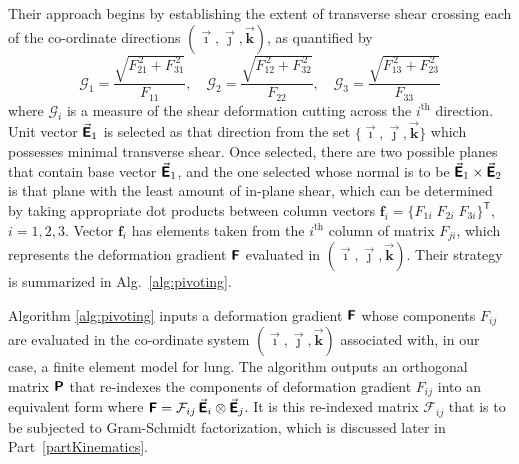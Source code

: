 Their approach begins by establishing the extent of transverse shear crossing each of the co-ordinate directions $( \vec{\boldsymbol{\imath}} , \vec{\boldsymbol{\jmath}} , \vec{\boldsymbol{k}} )$, as quantified by
\begin{equation}
\mathcal{G}_1 =\dfrac{\sqrt{F^{\,2}_{21}+F^{\,2}_{31}}}{F_{11}} , \quad
\mathcal{G}_2 =\dfrac{\sqrt{F^{\,2}_{12}+F^{\,2}_{32}}}{F_{22}} , \quad
\mathcal{G}_3 =\dfrac{\sqrt{F^{\,2}_{13}+F^{\,2}_{23}}}{F_{33}}
\end{equation} 
where $\mathcal{G}_i$ is a measure of the shear deformation cutting across the $i^{\text{th}}$ direction.  Unit vector $\vec{\boldsymbol{\mathsf{E}}}_1$ is selected as that direction from the set $\{ \vec{\boldsymbol{\imath}} , \vec{\boldsymbol{\jmath}} , \vec{\boldsymbol{k}} \}$ which possesses minimal transverse shear.  Once selected, there are two possible planes that contain base vector $\vec{\boldsymbol{\mathsf{E}}}_1$, and the one selected whose normal is to be $\vec{\boldsymbol{\mathsf{E}}}_1 \times \vec{\boldsymbol{\mathsf{E}}}_2$ is that plane with the least amount of in-plane shear, which can be determined by taking appropriate dot products between column vectors $\boldsymbol{f}_i = \{ F_{1i} \; F_{2i} \; F_{3i} \}^{\mathsf{T}}$, $i=1,2,3$.  Vector $\boldsymbol{f}_i$ has elements taken from the $i^{\text{th}}$ column of matrix $F_{ji}$, which represents the deformation gradient $\boldsymbol{\mathsf{F}}$ evaluated in $( \vec{\boldsymbol{\imath}} , \vec{\boldsymbol{\jmath}} , \vec{\boldsymbol{k}} )$.  Their strategy is summarized in Alg.~\ref{alg:pivoting}.

Algorithm \ref{alg:pivoting} inputs a deformation gradient $\boldsymbol{\mathsf{F}}$ whose components $F_{ij}$ are evaluated in the co-ordinate system $(  \vec{\boldsymbol{\imath}} , \vec{\boldsymbol{\jmath}} , \vec{\boldsymbol{k}} )$ associated with, in our case, a finite element model for lung.  The algorithm outputs an orthogonal matrix $\boldsymbol{\mathsf{P}}$ that re-indexes the components of deformation gradient $F_{ij}$ into an equivalent form where $\boldsymbol{\mathsf{F}} = \mathcal{F}_{ij} \, \vec{\boldsymbol{\mathsf{E}}}_i \otimes \vec{\boldsymbol{\mathsf{E}}}_j$.  It is this re-indexed matrix $\mathcal{F}_{ij}$ that is to be subjected to Gram-Schmidt factorization, which is discussed later in Part~\ref{partKinematics}.  

